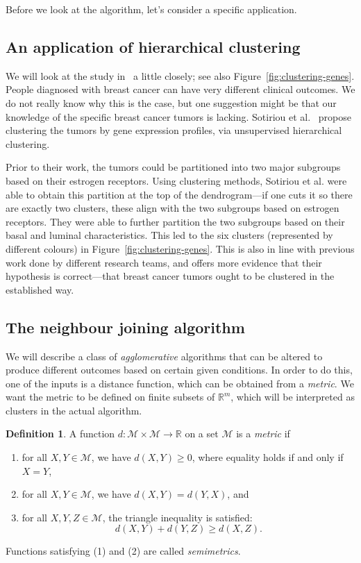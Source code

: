 \documentclass[a4paper, 12pt]{article}
\numberwithin{equation}{section}
\numberwithin{figure}{section}
\theoremstyle{definition}
\newtheorem{defn}[thm]{Definition}
\renewcommand{\geq}{\geqslant}
\newcommand{\R}{\mathbb{R}}
\begin{document}
Before we look at the algorithm, let's consider a specific application.

\subsection{An application of hierarchical clustering}

We will look at the study in~\cite{BreastCancer} a little closely; see also
Figure~\ref{fig:clustering-genes}. People diagnosed with breast cancer can have very
different clinical outcomes. We do not really know why this is the case, but one
suggestion might be that our knowledge of the specific breast cancer tumors is
lacking. Sotiriou et al.~\cite{BreastCancer} propose clustering the tumors by
gene expression profiles, via unsupervised hierarchical clustering. 

Prior to their work, the tumors could be partitioned into two major subgroups
based on their estrogen receptors. Using clustering methods, Sotiriou et al.
were able to obtain this partition at the top of the dendrogram---if one cuts it
so there are exactly two clusters, these align with the two subgroups based on
estrogen receptors. They were able to further partition the two subgroups based
on their basal and luminal characteristics. This led to the six clusters
(represented by different colours) in Figure~\ref{fig:clustering-genes}. This is also
in line with previous work done by different research teams, and offers more
evidence that their hypothesis is correct---that breast cancer tumors ought to
be clustered in the established way.

\subsection{The neighbour joining algorithm}

We will describe a class of \emph{agglomerative} algorithms that can be altered
to produce different outcomes based on certain given conditions. In order to do
this, one of the inputs is a distance function, which can be obtained from a
\emph{metric}. We want the metric to be defined on finite subsets of $\R^m$,
which will be interpreted as clusters in the actual algorithm. 

\begin{defn}
	A function $d: \mathscr{M}\times \mathscr{M} \to \R$ on a set $\mathscr{M}$
	is a \emph{metric} if 
	\begin{enumerate}
		\item for all $X, Y\in \mathscr{M}$, we have $d(X, Y) \geq 0$, where
		equality holds if and only if $X=Y$,
		\item for all $X, Y\in\mathscr{M}$, we have $d(X, Y) = d(Y, X)$, and
		\item for all $X, Y, Z\in\mathscr{M}$, the triangle inequality is
		satisfied:
		\[ 
			d(X, Y) + d(Y, Z) \geq d(X, Z). 
		\] 
	\end{enumerate}
	Functions satisfying (1) and (2) are called \emph{semimetrics}. 
\end{defn}
\end{document}
